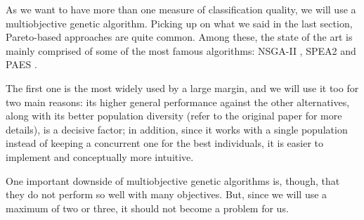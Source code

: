 	As we want to have more than one measure of classification quality, we will use a multiobjective genetic algorithm. Picking up on what we said in the last section, Pareto-based approaches are quite common. Among these, the state of the art is mainly comprised of some of the most famous algorithms: \ac{NSGA-II} \cite{deb2002fast}, \ac{SPEA2} \cite{zitzler2001spea2} and \ac{PAES} \cite{knowles1999pareto}. 

	The first one is the most widely used by a large margin, and we will use it too for two main reasons: its higher general performance against the other alternatives, along with its better population diversity (refer to the original paper for more details), is a decisive factor; in addition, since it works with a single population instead of keeping a concurrent one for the best individuals, it is easier to implement and conceptually more intuitive.

	One important downside of multiobjective genetic algorithms is, though, that they do not perform so well with many objectives. But, since we will use a maximum of two or three, it should not become a problem for us.